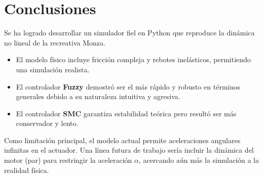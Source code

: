 \documentclass[
A4paper,            1 paper size A4
oneside,            %
openright,          %
10pt,               %
headings=normal,    %
titlepage=on        %
]{article}
\begin{document}
\section{Conclusiones}
Se ha logrado desarrollar un simulador fiel en Python que reproduce la dinámica no lineal de la recreativa Monza.
\begin{itemize}
    \item El modelo físico incluye fricción compleja y rebotes inelásticos, permitiendo una simulación realista.
    \item El controlador \textbf{Fuzzy} demostró ser el más rápido y robusto en términos generales debido a su naturaleza intuitiva y agresiva.
    \item El controlador \textbf{SMC} garantiza estabilidad teórica pero resultó ser más conservador y lento.
\end{itemize}

Como limitación principal, el modelo actual permite aceleraciones angulares infinitas en el actuador. Una línea futura de trabajo sería incluir la dinámica del motor (par) para restringir la aceleración $\alpha$, acercando aún más la simulación a la realidad física.

\end{document}
